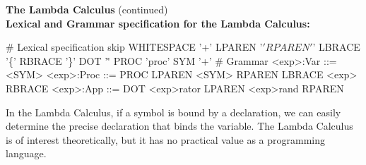 \begin{minipage}[t]{\sw}
\slidenumber
\LARGE
{\bf The Lambda Calculus} (continued)\\[2ex]
{\bf Lexical and Grammar specification for the Lambda Calculus:}
{\Large
\begin{qv}
# Lexical specification
skip WHITESPACE '\s+'
LPAREN '\('
RPAREN '\)'
LBRACE '\{'
RBRACE '\}'
DOT '\.'
PROC 'proc'
SYM '\w+'
%
# Grammar
<exp>:Var  ::= <SYM>
<exp>:Proc ::= PROC LPAREN <SYM> RPAREN LBRACE <exp> RBRACE
<exp>:App  ::= DOT <exp>rator LPAREN <exp>rand RPAREN
%
\end{qv}
}
In the Lambda Calculus,
if a symbol is bound by a declaration,
we can easily determine the precise declaration that binds the variable.
The Lambda Calculus is of interest theoretically,
but it has no practical value as a programming language.\exx
\end{minipage}
\clearpage
